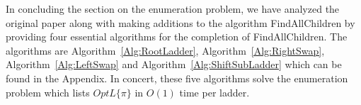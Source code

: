 




In concluding the section on the enumeration problem, we have analyzed the original paper along with 
making additions to the algorithm {\sc FindAllChildren} by providing four essential algorithms 
for the completion of {\sc FindAllChildren}. The algorithms are Algorithm~\ref{Alg:RootLadder}, Algorithm~\ref{Alg:RightSwap},
Algorithm~\ref{Alg:LeftSwap} and Algorithm~\ref{Alg:ShiftSubLadder} which can be found in the Appendix. In concert, these five algorithms solve the enumeration 
problem which lists $OptL\{\pi\}$ in $O(1)$ time per ladder. 

